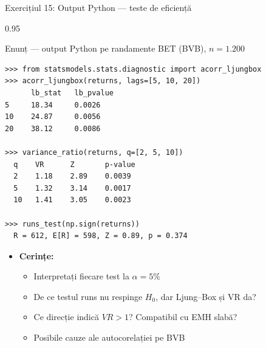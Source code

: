\documentclass[9pt, aspectratio=169, t]{beamer}
\begin{document}
\begin{frame}[fragile, shrink=25]{Exercițiul 15: Output Python --- teste de eficiență}
\begin{cminipage}{0.95\textwidth}
\begin{block}{Enunț --- output Python pe randamente BET (BVB), $n = 1.200$}
\begin{lstlisting}[basicstyle=\ttfamily\scriptsize, frame=single]
>>> from statsmodels.stats.diagnostic import acorr_ljungbox
>>> acorr_ljungbox(returns, lags=[5, 10, 20])
      lb_stat   lb_pvalue
5     18.34     0.0026
10    24.87     0.0056
20    38.12     0.0086

>>> variance_ratio(returns, q=[2, 5, 10])
  q    VR      Z       p-value
  2    1.18    2.89    0.0039
  5    1.32    3.14    0.0017
  10   1.41    3.05    0.0023

>>> runs_test(np.sign(returns))
  R = 612, E[R] = 598, Z = 0.89, p = 0.374
\end{lstlisting}
\end{block}
\begin{itemize}\setlength{\itemsep}{0pt}
    \item \textbf{Cerințe:}
    \begin{itemize}\setlength{\itemsep}{0pt}
        \item Interpretați fiecare test la $\alpha = 5\%$
        \item De ce testul runs nu respinge $H_0$, dar Ljung--Box și VR da?
        \item Ce direcție indică $VR > 1$? Compatibil cu EMH slabă?
        \item Posibile cauze ale autocorelației pe BVB
    \end{itemize}
\end{itemize}
\end{cminipage}
\end{frame}
\end{document}
